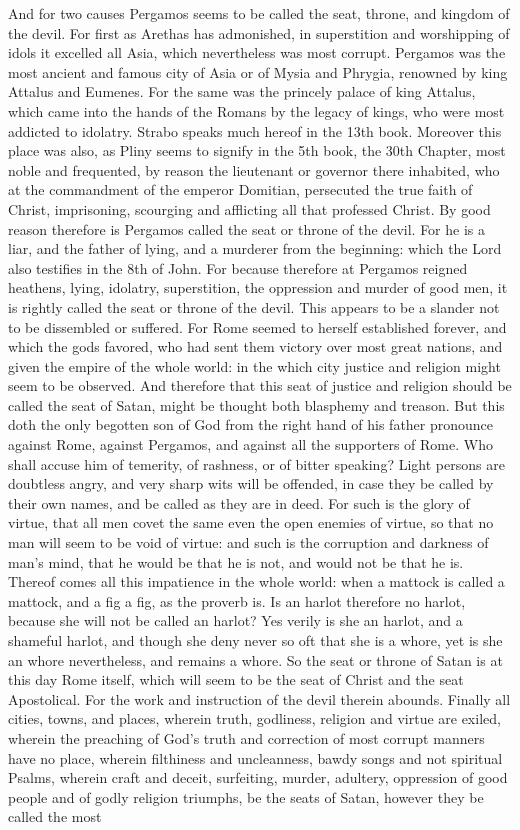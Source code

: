 And for two causes Pergamos seems to be called the seat, throne, and kingdom of the devil. For first as Arethas has admonished, in superstition and worshipping of idols it excelled all Asia, which nevertheless was most corrupt. Pergamos was the most ancient and famous city of Asia or of Mysia and Phrygia, renowned by king Attalus and Eumenes. For the same was the princely palace of king Attalus, which came into the hands of the Romans by the legacy of kings, who were most addicted to idolatry. Strabo speaks much hereof in the 13th book. Moreover this place was also, as Pliny seems to signify in the 5th book, the 30th Chapter, most noble and frequented, by reason the lieutenant or governor there inhabited, who at the commandment of the emperor Domitian, persecuted the true faith of Christ, imprisoning, scourging and afflicting all that professed Christ. By good reason therefore is Pergamos called the seat or throne of the devil. For he is a liar, and the father of lying, and a murderer from the beginning: which the Lord also testifies in the 8th of John. For because therefore at Pergamos reigned heathens, lying, idolatry, superstition, the oppression and murder of good men, it is rightly called the seat or throne of the devil. This appears to be a slander not to be dissembled or suffered. For Rome seemed to herself established forever, and which the gods favored, who had sent them victory over most great nations, and given the empire of the whole world: in the which city justice and religion might seem to be observed. And therefore that this seat of justice and religion should be called the seat of Satan, might be thought both blasphemy and treason. But this doth the only begotten son of God from the right hand of his father pronounce against Rome, against Pergamos, and against all the supporters of Rome. Who shall accuse him of temerity, of rashness, or of bitter speaking? Light persons are doubtless angry, and very sharp wits will be offended, in case they be called by their own names, and be called as they are in deed. For such is the glory of virtue, that all men covet the same even the open enemies of virtue, so that no man will seem to be void of virtue: and such is the corruption and darkness of man’s mind, that he would be that he is not, and would not be that he is. Thereof comes all this impatience in the whole world: when a mattock is called a mattock, and a fig a fig, as the proverb is. Is an harlot therefore no harlot, because she will not be called an harlot? Yes verily is she an harlot, and a shameful harlot, and though she deny never so oft that she is a whore, yet is she an whore nevertheless, and remains a whore. So the seat or throne of Satan is at this day Rome itself, which will seem to be the seat of Christ and the seat Apostolical. For the work and instruction of the devil therein abounds. Finally all cities, towns, and places, wherein truth, godliness, religion and virtue are exiled, wherein the preaching of God’s truth and correction of most corrupt manners have no place, wherein filthiness and uncleanness, bawdy songs and not spiritual Psalms, wherein craft and deceit, surfeiting, murder, adultery, oppression of good people and of godly religion triumphs, be the seats of Satan, however they be called the most 